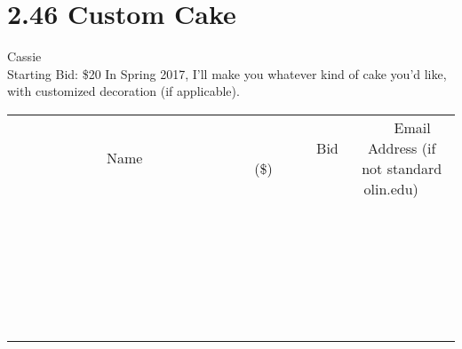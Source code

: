\documentclass[11pt]{article}
\begin{document}
\section*{2.46 Custom Cake}
Cassie
\\
Starting Bid: \$20
\newline
In Spring 2017, I'll make you whatever kind of cake you'd like, with customized decoration (if applicable).
\\[6ex]
\begin{tabular}{c c c}
~~~~~~~~~~~~~Name~~~~~~~~~~~~~ & ~~~~~~~~~Bid (\$)~~~~~~~~~  & ~~~Email Address (if not standard olin.edu)~~~\\
 & & \\
\hline
 & & \\
\hline
 & & \\
\hline
 & & \\
\hline
 & & \\
\hline
 & & \\
\hline
 & & \\
\hline
 & & \\
\hline
 & & \\
\hline
 & & \\
\hline
 & & \\
\hline
 & & \\
\hline
 & & \\
\hline
 & & \\
\hline
 & & \\
\hline
 & & \\
\hline
 & & \\
\hline
 & & \\
\hline
 & & \\
\hline
 & & \\
\hline
 & & \\
\hline
 & & \\
\hline
 & & \\
\hline
 & & \\
\hline
 & & \\
\hline
 & & \\
\hline
\end{tabular}
\newpage
\end{document}
